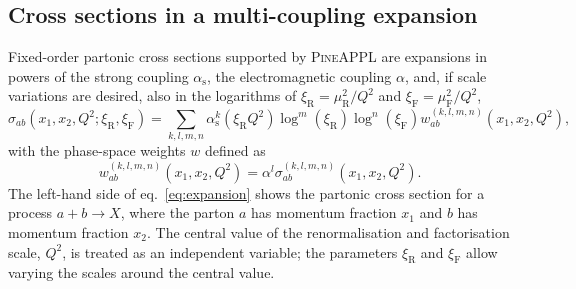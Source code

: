 \subsection{Cross sections in a multi-coupling expansion}
\label{sec:multi-coupling-expansion}

Fixed-order partonic cross sections supported by \textsc{PineAPPL} are expansions in powers of the strong coupling $\alpha_\mathrm{s}$, the electromagnetic coupling $\alpha$, and, if scale variations are desired, also in the logarithms of $\xi_\mathrm{R} = \mu_\mathrm{R}^2 / Q^2$ and $\xi_\mathrm{F} = \mu_\mathrm{F}^2 / Q^2$,
\begin{equation}
\sigma_{ab} (x_1, x_2, Q^2; \xi_\mathrm{R}, \xi_\mathrm{F}) = \sum_{k,l,m,n} \alpha_\mathrm{s}^k \left( \xi_\mathrm{R} Q^2 \right) \log^m ( \xi_\mathrm{R} ) \log^n ( \xi_\mathrm{F} ) w_{ab}^{(k,l,m,n)} \left( x_1, x_2, Q^2 \right) \text{,}
\label{eq:expansion}
\end{equation}
with the phase-space weights $w$ defined as
\begin{equation}
w_{ab}^{(k,l,m,n)} \left( x_1, x_2, Q^2 \right) = \alpha^l \sigma_{ab}^{(k,l,m,n)} \left( x_1, x_2, Q^2 \right) \text{.}
\label{eq:phase-space-weight}
\end{equation}
The left-hand side of eq.~\eqref{eq:expansion} shows the partonic cross section for a process $a + b \to X$, where the parton $a$ has momentum fraction $x_1$ and $b$ has momentum fraction $x_2$.
The central value of the renormalisation and factorisation scale, $Q^2$, is treated as an independent variable; the parameters $\xi_\mathrm{R}$ and $\xi_\mathrm{F}$ allow varying the scales around the central value.

